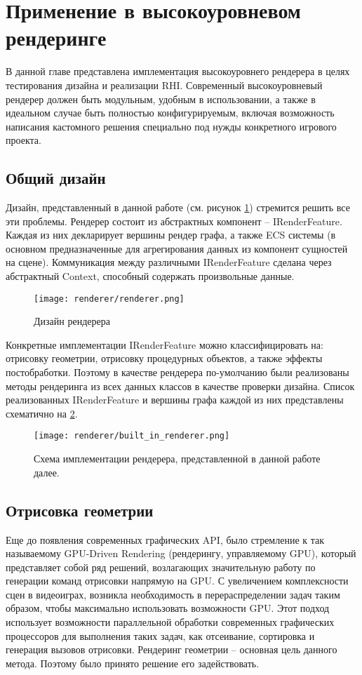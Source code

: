 \section{Применение в высокоуровневом рендеринге}
В данной главе представлена имплементация высокоуровнего рендерера в целях тестирования дизайна и реализации RHI. Современный высокоуровневый рендерер должен быть модульным, удобным в использовании, а также в идеальном случае быть полностью конфигурируемым, включая возможность написания кастомного решения специально под нужды конкретного игрового проекта.

\subsection{Общий дизайн}
Дизайн, представленный в данной работе (см. рисунок \ref{fig:renderer_design}) стремится решить все эти проблемы. Рендерер состоит из абстрактных компонент -- IRenderFeature. Каждая из них декларирует вершины рендер графа, а также ECS системы (в основном предназначенные для агрегирования данных из компонент сущностей на сцене). Коммуникация между различными IRenderFeature сделана через абстрактный Context, способный содержать произвольные данные.

\begin{figure}[h]
    \centering
    \texttt{[image: renderer/renderer.png]}
    \caption{Дизайн рендерера}
    \label{fig:renderer_design}
\end{figure}

Конкретные имплементации IRenderFeature можно классифицировать на: отрисовку геометрии, отрисовку процедурных объектов, а также эффекты постобработки. Поэтому в качестве рендерера по-умолчанию были реализованы методы рендеринга из всех данных классов в качестве проверки дизайна. Список реализованных IRenderFeature и вершины графа каждой из них представлены схематично на \ref{fig:built_in_renderer}.

\begin{figure}[h]
    \centering
    \texttt{[image: renderer/built\_in\_renderer.png]}
    \caption{Схема имплементации рендерера, представленной в данной работе далее.}
    \label{fig:built_in_renderer}
\end{figure}

\subsection{Отрисовка геометрии}
Еще до появления современных графических API, было стремление к так называемому GPU-Driven Rendering \cite{ubisoft_gpu_driven_rendering} (рендерингу, управляемому GPU), который представляет собой ряд решений, возлагающих значительную работу по генерации команд отрисовки напрямую на GPU. С увеличением комплексности сцен в видеоиграх, возникла необходимость в перераспределении задач таким образом, чтобы максимально использовать возможности GPU. Этот подход использует возможности параллельной обработки современных графических процессоров для выполнения таких задач, как отсеивание, сортировка и генерация вызовов отрисовки. Рендеринг геометрии -- основная цель данного метода. Поэтому было принято решение его задействовать.

